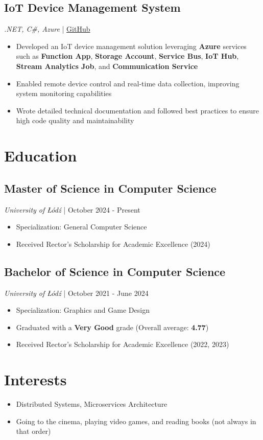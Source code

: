 \documentclass[a4paper,10pt]{article}
\begin{document}
\subsection{IoT Device Management System}
\textit{.NET, C\#, Azure} | \href{https://github.com/ZDSDD/IoT_OpcAgent}{GitHub}

\begin{itemize}[leftmargin=0.5cm, itemsep=4pt, nosep]
    \item Developed an IoT device management solution leveraging \textbf{Azure} services such as \textbf{Function App}, \textbf{Storage Account}, \textbf{Service Bus}, \textbf{IoT Hub}, \textbf{Stream Analytics Job}, and \textbf{Communication Service}
    \item Enabled remote device control and real-time data collection, improving system monitoring capabilities
    \item Wrote detailed technical documentation and followed best practices to ensure high code quality and maintainability
\end{itemize}


\section{Education}

\subsection{Master of Science in Computer Science}
\textit{University of Łódź} | October 2024 - Present
\begin{itemize}[leftmargin=0.5cm, nosep]
    \item Specialization: General Computer Science
    \item Received Rector's Scholarship for Academic Excellence (2024)
\end{itemize}

\subsection{Bachelor of Science in Computer Science}
\textit{University of Łódź} | October 2021 - June 2024
\begin{itemize}[leftmargin=0.5cm, nosep]
    \item Specialization: Graphics and Game Design
    \item Graduated with a \textbf{Very Good} grade (Overall average: \textbf{4.77})
    \item Received Rector's Scholarship for Academic Excellence (2022, 2023)
\end{itemize}

\section{Interests}
\begin{itemize}[leftmargin=0.5cm, nosep]
    \item Distributed Systems, Microservices Architecture
    \item Going to the cinema, playing video games, and reading books (not always in that order)
\end{itemize}
\end{document}
